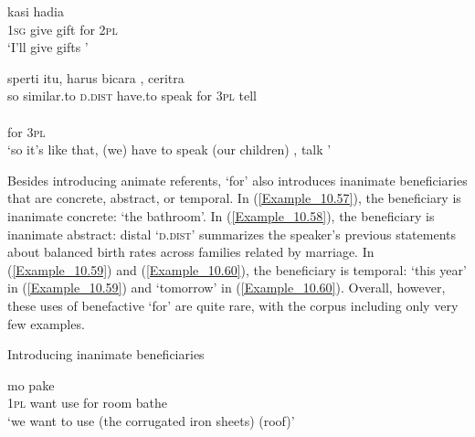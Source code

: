 \ea
\label{Example_10.55}
 {kasi} {hadia} {} {}\\ %
 \textsc{1sg}  give  gift  for  \textsc{2pl}\\
\glt 
‘I’ll give gifts ’ \textstyleExampleSource{[080922-001a-CvPh.1332]}
\z

\ea
\label{Example_10.56}
 {{sperti}} {itu,} {harus} {bicara} {} {,} {ceritra}\\ %
 so  {similar.to}  \textsc{d.dist}  have.to  speak  for  \textsc{3pl}  tell\\
   {}\\
 {for}  {\textsc{3pl}}\\
\glt 
‘so it’s like that, (we) have to speak  (our children) , talk ’ \textstyleExampleSource{[081014-007-CvEx.0136]}
\z


Besides introducing animate referents,  ‘for’ also introduces inanimate beneficiaries that are concrete, abstract, or temporal. In (\ref{Example_10.57}), the beneficiary is inanimate concrete:  ‘the bathroom’. In (\ref{Example_10.58}), the beneficiary is inanimate abstract: distal   ‘\textsc{d.dist}’ summarizes the speaker’s previous statements about balanced birth rates across families related by marriage. In (\ref{Example_10.59}) and (\ref{Example_10.60}), the beneficiary is temporal:  ‘this year’ in (\ref{Example_10.59}) and  ‘tomorrow’ in (\ref{Example_10.60}). Overall, however, these uses of benefactive  ‘for’ are quite rare, with the corpus including only very few examples.


\begin{styleExampleTitle}
Introducing inanimate beneficiaries
\end{styleExampleTitle}

\ea
\label{Example_10.57}
 {mo} {pake} {} {} {}\\ %
 \textsc{1pl}  want  use  for  room  bathe\\
\glt 
‘we want to use (the corrugated iron sheets)  (roof)’ \textstyleExampleSource{[080925-003-Cv.0005]}
\z

